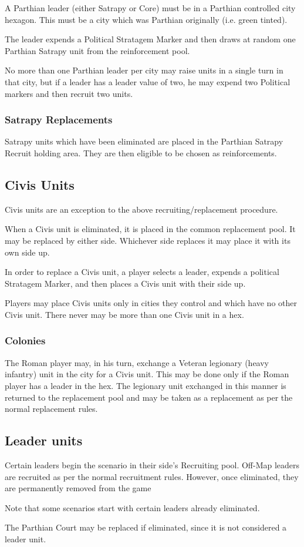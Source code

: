 A Parthian leader (either Satrapy or Core) must be in a Parthian controlled city hexagon. This must be a city which was Parthian originally (i.e. green tinted).

The leader expends a Political Stratagem Marker and then draws at random one Parthian Satrapy unit from the reinforcement pool.

No more than one Parthian leader per city may raise units in a single turn in that city, but if a leader has a leader value of two, he may expend two Political markers and then recruit two units.

\subsubsection{Satrapy Replacements}

Satrapy units which have been eliminated are placed in the Parthian Satrapy Recruit holding area. They are then eligible to be chosen as reinforcements.

\subsection{Civis Units}

Civis units are an exception to the above recruiting/replacement procedure.

When a Civis unit is eliminated, it is placed in the common replacement pool. It may be replaced by either side. Whichever side replaces it may place it with its own side up.

In order to replace a Civis unit, a player selects a leader, expends a political Stratagem Marker, and then places a Civis unit with their side up.

Players may place Civis units only in cities they control and which have no other Civis unit. There never may be more than one Civis unit in a hex.

\subsubsection{Colonies}

The Roman player may, in his turn, exchange a Veteran legionary (heavy infantry) unit in the city for a Civis unit. This may be done only if the Roman player has a leader in the hex. The legionary unit exchanged in this manner is returned to the replacement pool and may be taken as a replacement as per the normal replacement rules.

\subsection{Leader units}

Certain leaders begin the scenario in their side's Recruiting pool. Off-Map leaders are recruited as per the normal recruitment rules. However, once eliminated, they are permanently removed from the game

Note that some scenarios start with certain leaders already eliminated.

The Parthian Court may be replaced if eliminated, since it is not considered a leader unit.